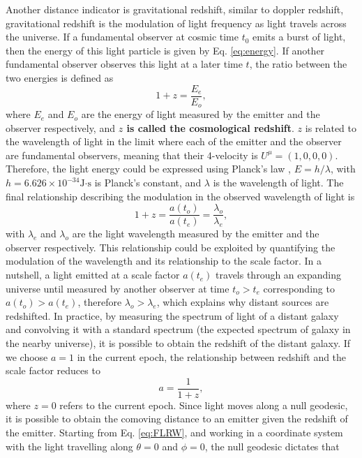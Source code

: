 Another distance indicator is gravitational redshift, similar to doppler redshift, gravitational redshift is the modulation of light frequency as light travels across the universe. If a fundamental observer at cosmic time $t_{0}$ emits a burst of light, then the energy of this light particle is given by  Eq. \ref{eq:energy}. If another fundamental observer observes this light at a later time $t$, the ratio between the two energies is defined as
\begin{equation}
    1 + z = \frac{E_e}{E_o},
\end{equation}
where $E_e$ and $E_o$ are the energy of light measured by the emitter and the observer respectively, and \textbf{$z$ is called the cosmological redshift}. $z$ is related to the wavelength of light in the limit where each of the emitter and the observer are fundamental observers, meaning that their 4-velocity is $U^{\mu} = (1, 0, 0, 0)$. Therefore, the light energy could be expressed using Planck's law \citep{Planck1900b},  $E = h/\lambda$, with $h = 6.626 \times 10^{-34} \text{J·s}$ is Planck's constant, and $\lambda$ is the wavelength of light. The final relationship describing the modulation in the observed wavelength of light is 
\begin{equation} \label{eq:redshift_freq}
    1 + z = \frac{a(t_o)}{a(t_e)} = \frac{\lambda_o}{\lambda_e},
\end{equation}
with $\lambda_e$ and $\lambda_o$ are the light wavelength measured by the emitter and the observer respectively. This relationship could be exploited by quantifying the modulation of the wavelength and its relationship to the scale factor. In a nutshell, a light emitted at a scale factor $a(t_e)$ travels through an expanding universe until measured by another observer at time $t_o > t_e$ corresponding to $a(t_o) > a(t_e)$, therefore $\lambda_o > \lambda_e$, which explains why distant sources are redshifted. In practice, by measuring the spectrum of light of a distant galaxy and convolving it with a standard spectrum (the expected spectrum of galaxy in the nearby universe), it is possible to obtain the redshift of the distant galaxy. If we choose $a = 1$ in the current epoch, the relationship between redshift and the scale factor reduces to
\begin{equation} \label{eq:redshift}
    a = \frac{1}{1 + z},
\end{equation}
where $z = 0$ refers to the current epoch. Since light moves along a null geodesic, it is possible to obtain the comoving distance to an emitter given the redshift of the emitter. Starting from Eq. \ref{eq:FLRW}, and working in a coordinate system with the light travelling along $\theta = 0 $ and $\phi = 0$, the null geodesic dictates that 
